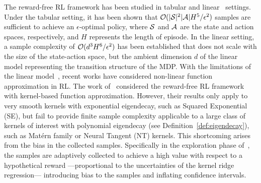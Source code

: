 The reward-free RL framework has been studied in tabular \citep{jin2020reward} and linear~\citep{wang2020reward} settings.
Under the tabular setting, it has been shown that $\mathcal{O}(|\mathcal{S}|^2|\mathcal{A}|H^5/\epsilon^2)$ samples are sufficient to achieve an $\epsilon$-optimal policy, where $\mathcal{S}$ and $\mathcal{A}$ are the state and action spaces, respectively, and $H$ represents the length of episode. In the linear setting, a sample complexity of $\mathcal{O}(d^3H^6/\epsilon^2)$ has been established that does not scale with the size of the state-action space, but the ambient dimension $d$ of the linear model representing the transition structure of the MDP. With the limitations of the linear model~\citep[e.g., as shown in][]{lee2023demystifying}, recent works have considered non-linear function approximation in RL. The work
of~\citet{qiu2021reward} considered the reward-free RL framework with 
kernel-based function approximation. However, their results only apply to very smooth kernels with exponential eigendecay, such as Squared Exponential (SE), but fail to provide finite sample complexity applicable to a large class of kernels of interest with polynomial eigendecay (see Definition~\ref{def:eigendecay}), such as Mat{\'e}rn family or Neural Tangent (NT) kernels.
This shortcoming arises from the bias in the collected samples. Specifically in the exploration phase of~\citet{qiu2021reward}, the samples are adaptively collected to achieve a high value with respect to a hypothetical reward ---proportional to the uncertainties of the kernel ridge regression--- introducing bias to the samples and inflating confidence intervals. 

